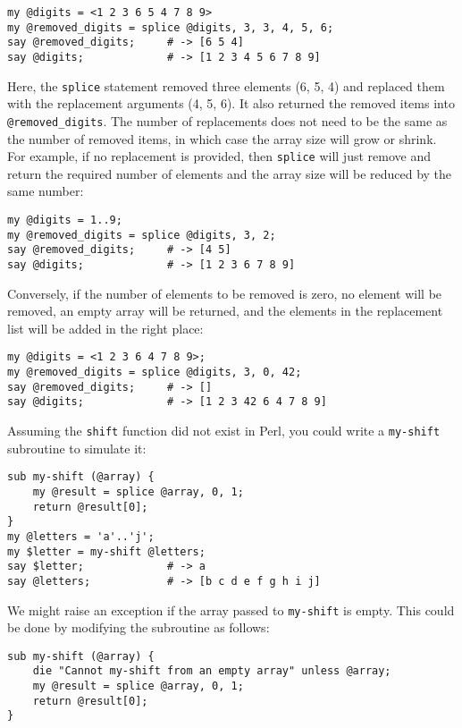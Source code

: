\begin{verbatim}
my @digits = <1 2 3 6 5 4 7 8 9>
my @removed_digits = splice @digits, 3, 3, 4, 5, 6;
say @removed_digits;     # -> [6 5 4]
say @digits;             # -> [1 2 3 4 5 6 7 8 9]
\end{verbatim}
%
Here, the {\tt splice} statement removed three elements (6, 5, 4) 
and replaced them with the replacement arguments (4, 5, 6). 
It also returned the removed items into \verb'@removed_digits'. 
The number of replacements does not need to be the same as the number 
of removed items, in which case the array size will grow or 
shrink. For example, if no replacement is provided, then 
{\tt splice} will just remove and return the required number 
of elements and the array size will be reduced by the same number:

\begin{verbatim}
my @digits = 1..9;
my @removed_digits = splice @digits, 3, 2;
say @removed_digits;     # -> [4 5]
say @digits;             # -> [1 2 3 6 7 8 9]
\end{verbatim}
%

Conversely, if the number of elements to be removed is zero, 
no element will be removed, an empty array will be returned, 
and the elements in the replacement list will be added in 
the right place:

\begin{verbatim}
my @digits = <1 2 3 6 4 7 8 9>;
my @removed_digits = splice @digits, 3, 0, 42;
say @removed_digits;     # -> []
say @digits;             # -> [1 2 3 42 6 4 7 8 9]
\end{verbatim}
%

Assuming the {\tt shift} function did not exist in Perl, 
you could write a {\tt my-shift} subroutine to simulate it:

\begin{verbatim}
sub my-shift (@array) {
    my @result = splice @array, 0, 1;
    return @result[0];
}
my @letters = 'a'..'j';
my $letter = my-shift @letters;
say $letter;             # -> a
say @letters;            # -> [b c d e f g h i j]
\end{verbatim}

We might raise an exception if the array passed to 
{\tt my-shift} is empty. This could be done by modifying 
the subroutine as follows:

\begin{verbatim}
sub my-shift (@array) {
    die "Cannot my-shift from an empty array" unless @array;
    my @result = splice @array, 0, 1;
    return @result[0];
}
\end{verbatim}
%

